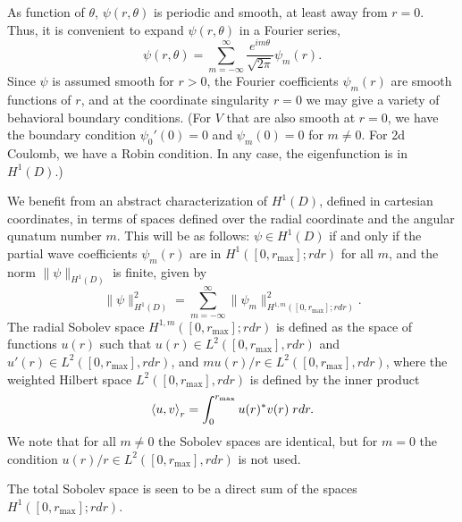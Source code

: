 \documentclass[12pt]{article}
\begin{document}
As function of $\theta$, $\psi(r,\theta)$ is periodic and smooth, at least away from $r=0$. Thus, it is convenient to expand $\psi(r,\theta)$ in a Fourier series,
\begin{equation}
    \psi(r,\theta) = \sum_{m=-\infty}^\infty \frac{e^{im\theta}}{\sqrt{2\pi}} \psi_m(r).
\end{equation}
Since $\psi$ is assumed smooth for $r>0$, the Fourier coefficients $\psi_m(r)$ are smooth functions of $r$, and at the coordinate singularity $r=0$ we may give a variety of behavioral boundary conditions. (For $V$ that are also smooth at $r=0$, we have the boundary condition $\psi_0'(0) = 0$ and $\psi_m(0) = 0$ for $m\neq 0$. For 2d Coulomb, we have a Robin condition. In any case, the eigenfunction is in $H^1(D)$.)

We benefit from an abstract characterization of $H^1(D)$, defined in cartesian coordinates, in terms of spaces defined over the radial coordinate and the angular qunatum number $m$. This will be as follows: $\psi \in H^1(D)$ if and only if the partial wave coefficients $\psi_m(r)$ are in $H^1([0,r_\text{max}];r dr)$ for all $m$, and the norm $\|\psi\|_{H^1(D)}$ is finite, given by
\begin{equation}
    \|\psi\|_{H^1(D)}^2 = \sum_{m=-\infty}^\infty \|\psi_m\|_{H^{1,m}([0,r_\text{max}];r dr)}^2.
\end{equation}
The radial Sobolev space $H^{1,m}([0,r_\text{max}];r dr)$ is defined as the space of functions $u(r)$ such that $u(r) \in L^2([0,r_\text{max}], r dr)$ and $u'(r) \in L^2([0,r_\text{max}], r dr)$, and $m u(r)/r \in L^2([0,r_\text{max}], r dr)$, where the weighted Hilbert space $L^2([0,r_\text{max}], r dr)$ is defined by the inner product
\begin{equation}
    \braket{u,v}_r = \int_0^{r_\text{max}} u(r)^* v(r)\;  r dr.
\end{equation}
We note that for all $m\neq 0$ the Sobolev spaces are identical, but for $m=0$ the condition $u(r)/r \in L^2([0,r_\text{max}], r dr)$ is not used.

The total Sobolev space is seen to be a direct sum of the spaces $H^1([0,r_\text{max}];r dr)$.
\end{document}

